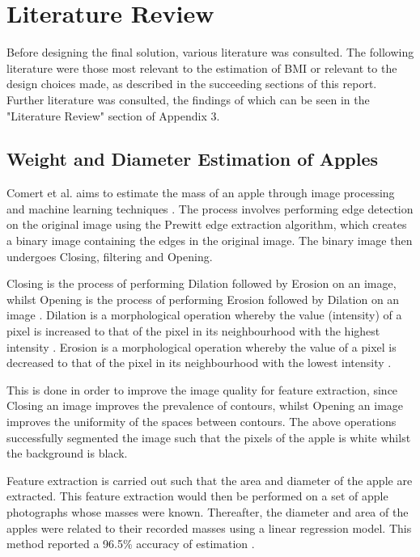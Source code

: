 \documentclass[conference]{IEEEtran}
\begin{document}
\section{Literature Review}
Before designing the final solution, various literature was consulted.
The following literature were those most relevant to the estimation of BMI or relevant to the design choices made, as described in the succeeding sections of this report.
Further literature was consulted, the findings of which can be seen in the "Literature Review" section of Appendix 3.
\subsection{Weight and Diameter Estimation of Apples}
Comert et al. aims to estimate the mass of an apple through image processing and machine learning techniques \cite{comert}.
The process involves performing edge detection on the original image using the Prewitt edge extraction algorithm, which creates a binary image containing the edges in the original image.
The binary image then undergoes Closing, filtering and Opening.

Closing is the process of performing Dilation followed by Erosion on an image, whilst Opening is the process of performing Erosion followed by Dilation on an image \cite{opening,closing}.
Dilation is a morphological operation whereby the value (intensity) of a pixel is increased to that of the pixel in its neighbourhood with the highest intensity \cite{mathworksdilationerosion}.
Erosion is a morphological operation whereby the value of a pixel is decreased to that of the pixel in its neighbourhood with the lowest intensity \cite{mathworksdilationerosion}.

This is done in order to improve the image quality for feature extraction, since Closing an image improves the prevalence of contours, whilst Opening an image improves the uniformity of the spaces between contours.
The above operations successfully segmented the image such that the pixels of the apple is white whilst the background is black.

Feature extraction is carried out such that the area and diameter of the apple are extracted.
This feature extraction would then be performed on a set of apple photographs whose masses were known.
Thereafter, the diameter and area of the apples were related to their recorded masses using a linear regression model.
This method reported a 96.5\% accuracy of estimation \cite{comert}.
\end{document}
